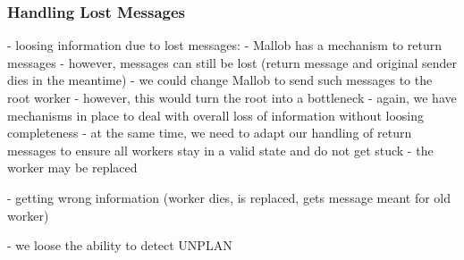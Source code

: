\subsubsection{Handling Lost Messages}
	- loosing information due to lost messages:
		- Mallob has a mechanism to return messages
		- however, messages can still be lost (return message and original sender dies in the meantime)
		- we could change Mallob to send such messages to the root worker
		- however, this would turn the root into a bottleneck
		- again, we have mechanisms in place to deal with overall loss of information without loosing completeness
		- at the same time, we need to adapt our handling of return messages to ensure all workers stay in a valid state and do not get stuck
		- the worker may be replaced
		
	- getting wrong information (worker dies, is replaced, gets message meant for old worker)
	
	- we loose the ability to detect UNPLAN
